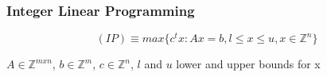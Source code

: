 \documentclass{beamer}
\begin{document}
    \begin{frame}
        \frametitle{Integer Linear Programming}
        \begin{equation*}
            (IP) \equiv max\{c^tx : Ax = b, l \leq x \leq u, x \in \mathbb{Z}^n \}
        \end{equation*}
        \begin{center}
        $A \in \mathbb{Z}^{mxn}$, $b \in \mathbb{Z}^m$, $c \in \mathbb{Z}^n$, $l$  and $u$ lower and upper bounds for x
        \end{center}
        
        

\end{frame}
\end{document}
